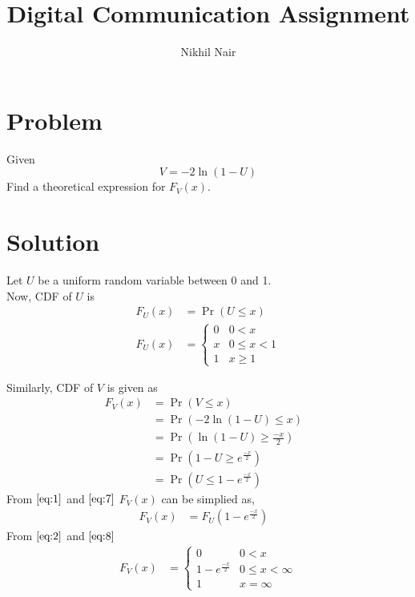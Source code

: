\documentclass[journal,12pt,twocolumn]{IEEEtran}
\title{\mytitle}
\title{
Digital Communication Assignment
}
\author{Nikhil Nair}
\providecommand{\pr}[1]{\ensuremath{\Pr\left(#1\right)}}
\providecommand{\brak}[1]{\ensuremath{\left(#1\right)}}
\begin{document}
\maketitle
\bigskip


\section{\textbf{Problem }}
Given 
\begin{equation}
V = -2\ln\brak{1-U}  \nonumber
\end{equation}
Find a theoretical expression for $F_V (x)$.

\section{\textbf{Solution }}
Let $U$ be a uniform random variable between 0 and 1.
\\
Now, CDF of $U$ is 
\begin{align}
F_{U}(x) &= \pr{U \le x}   \label{eq:1}
\\
F_{U}(x)  &= 
\begin{cases}
0 & 0 < x 
\\
x & 0 \le x < 1
\\ 
1 &  x \ge 1                \label{eq:2}
\end{cases}
\end{align}

Similarly, CDF of $V$ is given as
\begin{align}
F_{V}(x) &= \pr{V \le x}&
\\
&= \pr{-2\ln\brak{1-U} \le x}&
\\
&= \pr{\ln\brak{1-U} \ge \frac{-x}{2}}&
\\
&= \pr{1-U \ge e^{\frac{-x}{2}}}&
\\
&= \pr{U \le 1-e^{\frac{-x}{2}}}&  \label{eq:7}
\end{align}
From $\eqref{eq:1}$ and $\eqref{eq:7}$ $F_V (x)$ can be simplied as,
\begin{align}
F_{V}(x) &= F_{U}(1-e^{\frac{-x}{2}})&    \label{eq:8}
\end{align}
From $\eqref{eq:2}$ and $\eqref{eq:8}$
\begin{align}
F_{V}(x)  &= 
\begin{cases}
0 & 0 < x 
\\
1-e^{\frac{-x}{2}} & 0 \le x < \infty
\\ 
1 &  x = \infty                
\end{cases}
\end{align}
\end{document}
